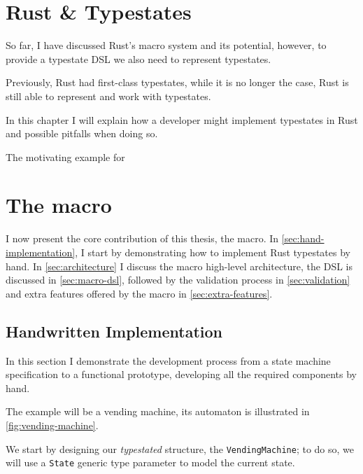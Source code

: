 

\chapter{Rust \& Typestates}

So far, I have discussed Rust's macro system and its potential, however,
to provide a typestate DSL we also need to represent typestates.

Previously, Rust had first-class typestates, while it is no longer the case,
Rust is still able to represent and work with typestates.

In this chapter I will explain how a developer might implement typestates in Rust
and possible pitfalls when doing so.

The motivating example for

\chapter{The  macro}\label{cha:macro}

I now present the core contribution of this thesis, the  macro.
In \autoref{sec:hand-implementation}, I start by demonstrating how to implement Rust typestates by hand.
In \autoref{sec:architecture} I discuss the macro high-level architecture,
the DSL is discussed in \autoref{sec:macro-dsl},
followed by the validation process in \autoref{sec:validation} and
extra features offered by the macro in \autoref{sec:extra-features}.

\section{Handwritten Implementation}\label{sec:hand-implementation}

In this section I demonstrate the development process from a state machine specification to a functional prototype,
developing all the required components by hand.

The example will be a vending machine, its automaton is illustrated in \autoref{fig:vending-machine}.

We start by designing our \emph{typestated} structure, the \texttt{VendingMachine};
to do so, we will use a \texttt{State} generic type parameter to model the current state.

